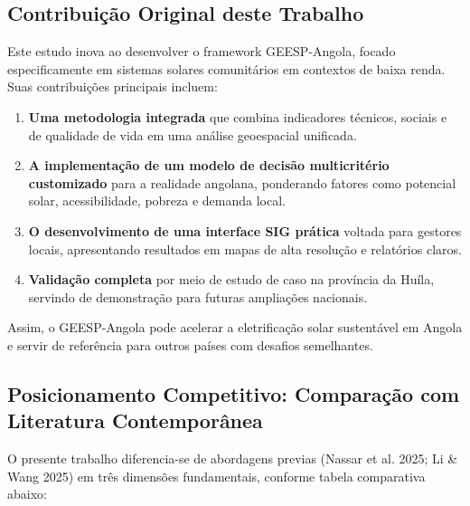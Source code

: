 \documentclass[12pt, a4paper]{article}
\begin{document}
\subsection{Contribuição Original deste Trabalho}

Este estudo inova ao desenvolver o framework GEESP-Angola, focado especificamente em sistemas solares comunitários em contextos de baixa renda. Suas contribuições principais incluem:

\begin{enumerate}
\item \textbf{Uma metodologia integrada} que combina indicadores técnicos, sociais e de qualidade de vida em uma análise geoespacial unificada.
\item \textbf{A implementação de um modelo de decisão multicritério customizado} para a realidade angolana, ponderando fatores como potencial solar, acessibilidade, pobreza e demanda local.
\item \textbf{O desenvolvimento de uma interface SIG prática} voltada para gestores locais, apresentando resultados em mapas de alta resolução e relatórios claros.
\item \textbf{Validação completa} por meio de estudo de caso na província da Huíla, servindo de demonstração para futuras ampliações nacionais.
\end{enumerate}

Assim, o GEESP-Angola pode acelerar a eletrificação solar sustentável em Angola e servir de referência para outros países com desafios semelhantes.

\subsection{Posicionamento Competitivo: Comparação com Literatura Contemporânea}

O presente trabalho diferencia-se de abordagens previas (Nassar et al. 2025; Li \& Wang 2025) em três dimensões fundamentais, conforme tabela comparativa abaixo:
\end{document}
